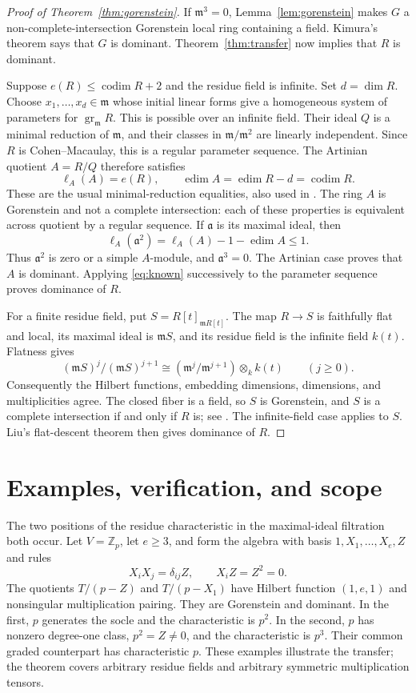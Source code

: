 \documentclass[11pt]{article}
\theoremstyle{remark}\newtheorem{remark}[theorem]{Remark}
\newcommand{\m}{\mathfrak m}
\newcommand{\gr}{\operatorname{gr}}
\newcommand{\edim}{\operatorname{edim}}
\newcommand{\codim}{\operatorname{codim}}
\begin{document}
\begin{proof}[Proof of Theorem~\ref{thm:gorenstein}]
If $\m^3=0$, Lemma~\ref{lem:gorenstein} makes $G$ a non-complete-intersection Gorenstein local ring containing a field. Kimura's theorem \cite[Theorem 7.3(1)]{K} says that $G$ is dominant. Theorem~\ref{thm:transfer} now implies that $R$ is dominant.

Suppose $e(R)\le\codim R+2$ and the residue field is infinite. Set $d=\dim R$. Choose $x_1,\ldots,x_d\in\m$ whose initial linear forms give a homogeneous system of parameters for $\gr_{\m}R$. This is possible over an infinite field. Their ideal $Q$ is a minimal reduction of $\m$, and their classes in $\m/\m^2$ are linearly independent. Since $R$ is Cohen--Macaulay, this is a regular parameter sequence. The Artinian quotient $A=R/Q$ therefore satisfies
\[
 \ell_A(A)=e(R),\qquad \edim A=\edim R-d=\codim R.
\]
These are the usual minimal-reduction equalities, also used in \cite[proof of Theorem 7.3(2)]{K}. The ring $A$ is Gorenstein and not a complete intersection: each of these properties is equivalent across quotient by a regular sequence. If $\mathfrak a$ is its maximal ideal, then
\[
 \ell_A(\mathfrak a^2)=\ell_A(A)-1-\edim A\le1.
\]
Thus $\mathfrak a^2$ is zero or a simple $A$-module, and $\mathfrak a^3=0$. The Artinian case proves that $A$ is dominant. Applying \eqref{eq:known} successively to the parameter sequence proves dominance of $R$.

For a finite residue field, put $S=R[t]_{\m R[t]}$. The map $R\to S$ is faithfully flat and local, its maximal ideal is $\m S$, and its residue field is the infinite field $k(t)$. Flatness gives
\[
 (\m S)^j/(\m S)^{j+1}\cong(\m^j/\m^{j+1})\otimes_k k(t)
 \qquad(j\ge0).
\]
Consequently the Hilbert functions, embedding dimensions, dimensions, and multiplicities agree. The closed fiber is a field, so $S$ is Gorenstein, and $S$ is a complete intersection if and only if $R$ is; see \cite[Tags 0BJL and 09Q7]{Stacks}. The infinite-field case applies to $S$. Liu's flat-descent theorem \cite[Theorem 3.8]{L} then gives dominance of $R$.
\end{proof}

\section{Examples, verification, and scope}
The two positions of the residue characteristic in the maximal-ideal filtration both occur. Let $V=\mathbb Z_p$, let $e\ge3$, and form the algebra with basis $1,X_1,\ldots,X_e,Z$ and rules
\[
 X_iX_j=\delta_{ij}Z,\qquad X_iZ=Z^2=0.
\]
The quotients $T/(p-Z)$ and $T/(p-X_1)$ have Hilbert function $(1,e,1)$ and nonsingular multiplication pairing. They are Gorenstein and dominant. In the first, $p$ generates the socle and the characteristic is $p^2$. In the second, $p$ has nonzero degree-one class, $p^2=Z\ne0$, and the characteristic is $p^3$. Their common graded counterpart has characteristic $p$. These examples illustrate the transfer; the theorem covers arbitrary residue fields and arbitrary symmetric multiplication tensors.
\end{document}
